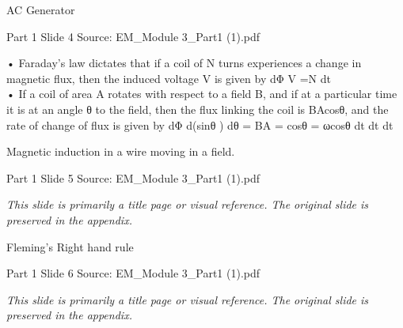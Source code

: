 \documentclass[11pt,a4paper]{article}
\begin{document}
\begin{mdframed}[roundcorner=9pt,backgroundcolor=white,linecolor=anthOrange,linewidth=1pt,innerleftmargin=12pt,innerrightmargin=12pt,innertopmargin=10pt,innerbottommargin=10pt,skipabove=8pt,skipbelow=10pt]
{\HeadingFont\fontsize{15}{18}\selectfont\color{anthDark}AC Generator\par}
{\color{anthMid}\small Part 1 \textbullet{} Slide 4 \textbullet{} Source: EM\_Module 3\_Part1 (1).pdf\par}
\vspace{0.5em}
{\small
• Faraday’s law dictates that if a coil of N turns experiences a change in magnetic flux, then the induced voltage V is given by dΦ V =N dt\\
\smallskip
• If a coil of area A rotates with respect to a field B, and if at a particular time it is at an angle θ to the field, then the flux linking the coil is BAcosθ, and the rate of change of flux is given by dΦ      d(sinθ ) dθ = BA         =    cosθ = ωcosθ dt        dt      dt\\

}
\end{mdframed}

\begin{mdframed}[roundcorner=9pt,backgroundcolor=white,linecolor=anthBlue,linewidth=1pt,innerleftmargin=12pt,innerrightmargin=12pt,innertopmargin=10pt,innerbottommargin=10pt,skipabove=8pt,skipbelow=10pt]
{\HeadingFont\fontsize{15}{18}\selectfont\color{anthDark}Magnetic induction in a wire moving in a field.\par}
{\color{anthMid}\small Part 1 \textbullet{} Slide 5 \textbullet{} Source: EM\_Module 3\_Part1 (1).pdf\par}
\vspace{0.5em}
{\small
\textit{This slide is primarily a title page or visual reference. The original slide is preserved in the appendix.}

}
\end{mdframed}

\begin{mdframed}[roundcorner=9pt,backgroundcolor=white,linecolor=anthGreen,linewidth=1pt,innerleftmargin=12pt,innerrightmargin=12pt,innertopmargin=10pt,innerbottommargin=10pt,skipabove=8pt,skipbelow=10pt]
{\HeadingFont\fontsize{15}{18}\selectfont\color{anthDark}Fleming’s Right hand rule\par}
{\color{anthMid}\small Part 1 \textbullet{} Slide 6 \textbullet{} Source: EM\_Module 3\_Part1 (1).pdf\par}
\vspace{0.5em}
{\small
\textit{This slide is primarily a title page or visual reference. The original slide is preserved in the appendix.}

}
\end{mdframed}
\end{document}
